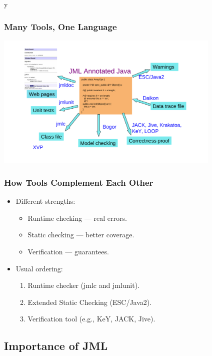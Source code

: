 \if y\MAKEHANDOUTS \documentclass[compress,landscape,handout]{beamer}
\begin{document}
\begin{frame}
\frametitle{Many Tools, One Language}
\includegraphics[width=4.25in]{tools-overview}
\end{frame}

\begin{frame}
\frametitle{How Tools Complement Each Other}
\begin{itemize}
\item
Different strengths:
\begin{itemize}
\item
Runtime checking --- real errors.

\item
Static checking --- better coverage.

\item
Verification --- guarantees.
\end{itemize}

\item
Usual ordering:
\begin{enumerate}
\item
Runtime checker (jmlc and jmlunit).

\item
Extended Static Checking (ESC/Java2).

\item
Verification tool (e.g., KeY, JACK, Jive).
\end{enumerate}
\end{itemize}
\end{frame}

\subsection[Importance]{Importance of JML}
\end{document}
